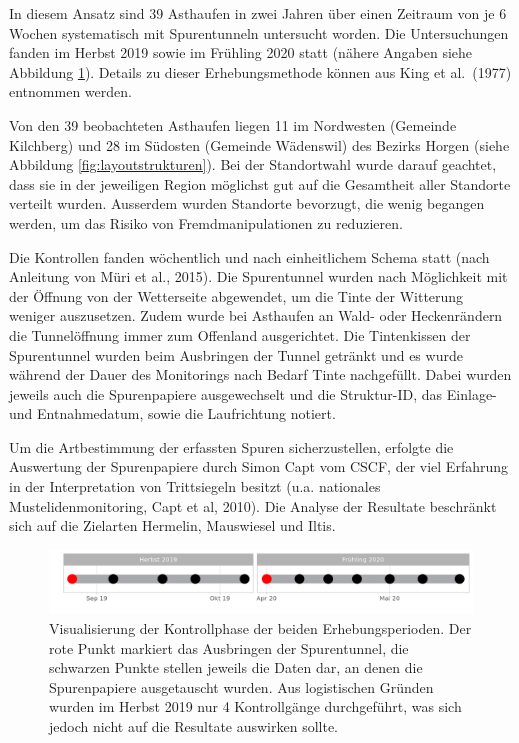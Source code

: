 \documentclass[
  oneside]{scrbook}
\begin{document}
In diesem Ansatz sind 39 Asthaufen in zwei Jahren über einen Zeitraum von je 6 Wochen systematisch mit Spurentunneln untersucht worden. Die Untersuchungen fanden im Herbst 2019 sowie im Frühling 2020 statt (nähere Angaben siehe Abbildung \ref{fig:erhebungswoche}). Details zu dieser Erhebungsmethode können aus King et al.~(1977) entnommen werden.

Von den 39 beobachteten Asthaufen liegen 11 im Nordwesten (Gemeinde Kilchberg) und 28 im Südosten (Gemeinde Wädenswil) des Bezirks Horgen (siehe Abbildung \ref{fig:layoutstrukturen}). Bei der Standortwahl wurde darauf geachtet, dass sie in der jeweiligen Region möglichst gut auf die Gesamtheit aller Standorte verteilt wurden. Ausserdem wurden Standorte bevorzugt, die wenig begangen werden, um das Risiko von Fremdmanipulationen zu reduzieren.

Die Kontrollen fanden wöchentlich und nach einheitlichem Schema statt (nach Anleitung von Müri et al., 2015). Die Spurentunnel wurden nach Möglichkeit mit der Öffnung von der Wetterseite abgewendet, um die Tinte der Witterung weniger auszusetzen. Zudem wurde bei Asthaufen an Wald- oder Heckenrändern die Tunnelöffnung immer zum Offenland ausgerichtet. Die Tintenkissen der Spurentunnel wurden beim Ausbringen der Tunnel getränkt und es wurde während der Dauer des Monitorings nach Bedarf Tinte nachgefüllt. Dabei wurden jeweils auch die Spurenpapiere ausgewechselt und die Struktur-ID, das Einlage- und Entnahmedatum, sowie die Laufrichtung notiert.

Um die Artbestimmung der erfassten Spuren sicherzustellen, erfolgte die Auswertung der Spurenpapiere durch Simon Capt vom CSCF, der viel Erfahrung in der Interpretation von Trittsiegeln besitzt (u.a. nationales Mustelidenmonitoring, Capt et al, 2010). Die Analyse der Resultate beschränkt sich auf die Zielarten Hermelin, Mauswiesel und Iltis.



\begin{figure}
\includegraphics[width=1\linewidth]{images/Erhebungswochen} \caption{Visualisierung der Kontrollphase der beiden Erhebungsperioden. Der rote Punkt markiert das Ausbringen der Spurentunnel, die schwarzen Punkte stellen jeweils die Daten dar, an denen die Spurenpapiere ausgetauscht wurden. Aus logistischen Gründen wurden im Herbst 2019 nur 4 Kontrollgänge durchgeführt, was sich jedoch nicht auf die Resultate auswirken sollte.}\label{fig:erhebungswoche}
\end{figure}
\end{document}
